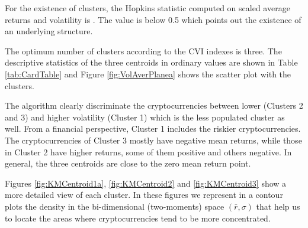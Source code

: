 \documentclass{bmcart}
\begin{document}
For the existence of clusters, the Hopkins statistic computed on scaled average returns and volatility is . The value is below 0.5 which points out the existence of an underlying structure.

The optimum number of clusters according to the CVI indexes is three. The descriptive statistics of the three centroids in ordinary values are shown in Table \ref{tab:CardTable} and Figure \ref{fig:VolAverPlanea} shows the scatter plot with the clusters. 

The algorithm clearly discriminate the cryptocurrencies between lower (Clusters 2 and 3) and higher volatility (Cluster 1) which is the less populated cluster as well. From a financial perspective, Cluster 1 includes the riskier cryptocurrencies. The cryptocurrencies of Cluster 3 mostly have negative mean returns, while those in Cluster 2 have higher returns, some of them positive and others negative. In general, the three centroids are close to the zero mean return point. 

Figures \ref{fig:KMCentroid1a}, \ref{fig:KMCentroid2} and \ref{fig:KMCentroid3} show a more detailed view of each cluster. In these figures we represent in a contour plots the density in the bi-dimensional (two-moments) space $(\bar{r},\sigma)$ that help us to locate the areas  where cryptocurrencies tend to be more concentrated.
\end{document}
